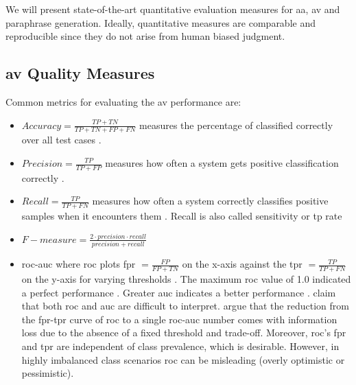 
We will present state-of-the-art quantitative evaluation measures for \ac{aa}, \ac{av} and paraphrase generation.
Ideally, quantitative measures are comparable and reproducible since they do not arise from human biased judgment.

\subsection{\ac{av} Quality Measures}
\label{subsec:av_quality_measures}

Common metrics for evaluating the \ac{av} performance are:
\begin{itemize}
    \item $Accuracy = \frac{TP + TN}{TP + TN + FP + FN}$ \citep{elmanarelbouanani_authorship_2014,neal_surveying_2018} 
    measures the percentage of classified correctly over all test cases \citep{neal_surveying_2018}.

    \item $Precision = \frac{TP}{TP + FP}$ \citep{elmanarelbouanani_authorship_2014,neal_surveying_2018,chen_web_2008} 
    measures how often a system gets positive classification correctly \citep{neal_surveying_2018}.

    \item $Recall = \frac{TP}{TP + FN}$ \citep{elmanarelbouanani_authorship_2014,neal_surveying_2018,chen_web_2008} 
    measures how often a system correctly classifies positive samples when it encounters them \citep{neal_surveying_2018}.
    Recall is also called sensitivity or \acl{tp} rate \citep{palivela_optimization_2021}

    \item $F-measure = \frac{2 \cdot precision \cdot recall}{precision + recall}$~\citep{chen_web_2008,abbasi_writeprints_2008}

    \item \ac{roc-auc} \citep{bevendorff_overview_2024,weerasinghe_feature_vector_difference_2021,kocher_unine_2015}
    where \ac{roc} plots \ac{fpr} $= \frac{FP}{FP+TN}$ on the x-axis against the \ac{tpr} $=\frac{TP}{TP+FN}$ on the y-axis 
    for varying thresholds \citep{kocher_unine_2015,neal_surveying_2018}.
    The maximum \ac{roc} value of 1.0 indicated a perfect performance \citep{kocher_unine_2015}.
    Greater \ac{auc} indicates a better performance \citep{neal_surveying_2018}.
    \citet{kocher_unine_2015} claim that both \ac{roc} and \ac{auc} are difficult to interpret.
    \citet{llm_detection_av_2025} argue that the reduction from the \ac{fpr}-\ac{tpr} curve of \ac{roc} to a single \ac{roc-auc} number 
    comes with information loss due to the absence of a fixed threshold and trade-off.
    Moreover, \ac{roc}'s \ac{fpr} and \ac{tpr} are independent of class prevalence, which is desirable.
    However, in highly imbalanced class scenarios \ac{roc} can be misleading (overly optimistic or pessimistic).
    

\end{itemize}

